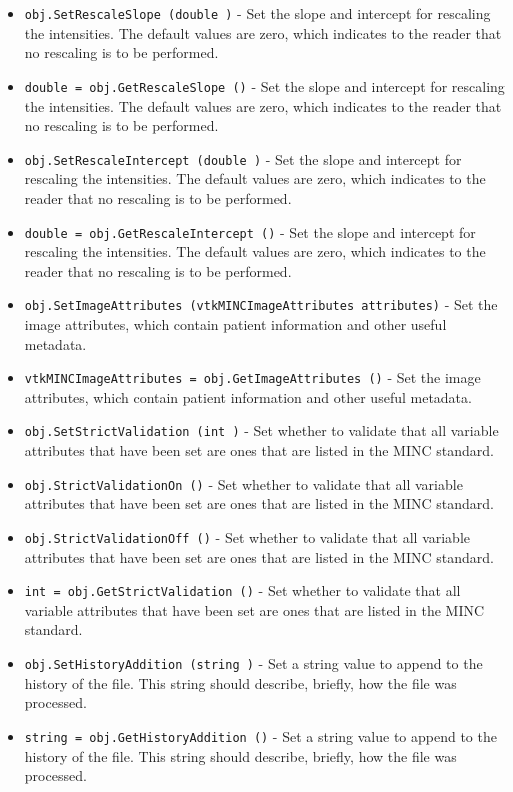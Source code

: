 \begin{itemize}
\item  \verb|obj.SetRescaleSlope (double )| -  Set the slope and intercept for rescaling the intensities.  The
 default values are zero, which indicates to the reader that no
 rescaling is to be performed.

\item  \verb|double = obj.GetRescaleSlope ()| -  Set the slope and intercept for rescaling the intensities.  The
 default values are zero, which indicates to the reader that no
 rescaling is to be performed.

\item  \verb|obj.SetRescaleIntercept (double )| -  Set the slope and intercept for rescaling the intensities.  The
 default values are zero, which indicates to the reader that no
 rescaling is to be performed.

\item  \verb|double = obj.GetRescaleIntercept ()| -  Set the slope and intercept for rescaling the intensities.  The
 default values are zero, which indicates to the reader that no
 rescaling is to be performed.

\item  \verb|obj.SetImageAttributes (vtkMINCImageAttributes attributes)| -  Set the image attributes, which contain patient information and
 other useful metadata.

\item  \verb|vtkMINCImageAttributes = obj.GetImageAttributes ()| -  Set the image attributes, which contain patient information and
 other useful metadata.

\item  \verb|obj.SetStrictValidation (int )| -  Set whether to validate that all variable attributes that
 have been set are ones that are listed in the MINC standard.

\item  \verb|obj.StrictValidationOn ()| -  Set whether to validate that all variable attributes that
 have been set are ones that are listed in the MINC standard.

\item  \verb|obj.StrictValidationOff ()| -  Set whether to validate that all variable attributes that
 have been set are ones that are listed in the MINC standard.

\item  \verb|int = obj.GetStrictValidation ()| -  Set whether to validate that all variable attributes that
 have been set are ones that are listed in the MINC standard.

\item  \verb|obj.SetHistoryAddition (string )| -  Set a string value to append to the history of the file.  This
 string should describe, briefly, how the file was processed.

\item  \verb|string = obj.GetHistoryAddition ()| -  Set a string value to append to the history of the file.  This
 string should describe, briefly, how the file was processed.

\end{itemize}
